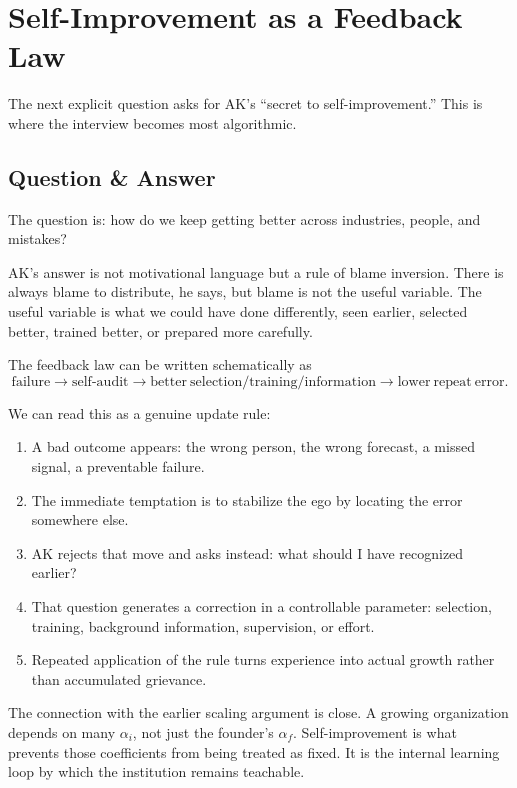\section{Self-Improvement as a Feedback Law}

The next explicit question asks for AK's ``secret to self-improvement.'' This is where the interview becomes most algorithmic.

\subsection{Question \& Answer}

The question is: how do we keep getting better across industries, people, and mistakes?

AK's answer is not motivational language but a rule of blame inversion. There is always blame to distribute, he says, but blame is not the useful variable. The useful variable is what we could have done differently, seen earlier, selected better, trained better, or prepared more carefully.

The feedback law can be written schematically as
\begin{equation}
\mathrm{failure}
\longrightarrow
\mathrm{self\mbox{-}audit}
\longrightarrow
\mathrm{better\ selection/training/information}
\longrightarrow
\mathrm{lower\ repeat\ error}.
\end{equation}

We can read this as a genuine update rule:
\begin{enumerate}
\item A bad outcome appears: the wrong person, the wrong forecast, a missed signal, a preventable failure.
\item The immediate temptation is to stabilize the ego by locating the error somewhere else.
\item AK rejects that move and asks instead: what should I have recognized earlier?
\item That question generates a correction in a controllable parameter: selection, training, background information, supervision, or effort.
\item Repeated application of the rule turns experience into actual growth rather than accumulated grievance.
\end{enumerate}

The connection with the earlier scaling argument is close. A growing organization depends on many \(\alpha_i\), not just the founder's \(\alpha_f\). Self-improvement is what prevents those coefficients from being treated as fixed. It is the internal learning loop by which the institution remains teachable.

